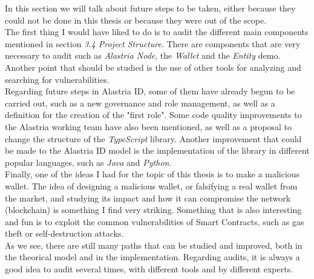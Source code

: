 In this section we will talk about future steps to be taken, either because they could not be done in this thesis or because they were out of the scope.\\
    
    The first thing I would have liked to do is to audit the different main components mentioned in section \textit{3.4 Project Structure}. There are components that are very necessary to audit such as \textit{Alastria Node}, the \textit{Wallet} and the \textit{Entity} demo. Another point that should be studied is the use of other tools for analyzing and searching for vulnerabilities.\\
    
    Regarding future steps in Alastria ID, some of them have already begun to be carried out, such as a new governance and role management, as well as a definition for the creation of the "first role". Some code quality improvements to the Alastria working team have also been mentioned, as well as a proposal to change the structure of the \textit{TypeScript} library. Another improvement that could be made to the Alastria ID model is the implementation of the library in different popular languages, such as \textit{Java} and \textit{Python}.\\
    
    Finally, one of the ideas I had for the topic of this thesis is to make a malicious wallet. The idea of designing a malicious wallet, or falsifying a real wallet from the market, and studying its impact and how it can compromise the network (blockchain) is something I find very striking. Something that is also interesting and fun is to exploit the common vulnerabilities of Smart Contracts, such as gas theft or self-destruction attacks.\\
    
    As we see, there are still many paths that can be studied and improved, both in the theorical model and in the implementation. Regarding audits, it is always a good idea to audit several times, with different tools and by different experts.

